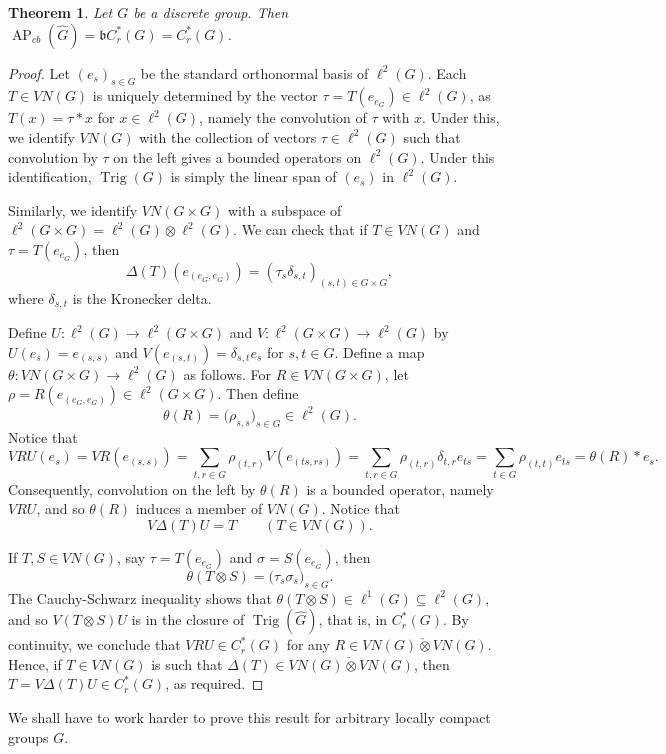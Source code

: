 \documentclass[twoside,a4paper]{article}
\newtheorem{theorem}{Theorem}[section]
\theoremstyle{definition}
\theoremstyle{remark}
\newcommand{\ap}{{\operatorname{AP}}}
\newcommand{\Trig}{{\operatorname{Trig}}}
\newcommand{\inten}{\check\otimes}
\newcommand{\mf}{\mathfrak}
\begin{document}
\begin{theorem}
Let $G$ be a discrete group.  Then $\ap_{cb}(\hat G) = \mf b C^*_r(G) = C^*_r(G)$.
\end{theorem}
\begin{proof}
Let $(e_s)_{s\in G}$ be the standard orthonormal basis of $\ell^2(G)$.  Each $T\in VN(G)$
is uniquely determined by the vector $\tau = T(e_{e_G})\in\ell^2(G)$, as $T(x) = \tau * x$
for $x\in\ell^2(G)$, namely the convolution of $\tau$ with $x$.  Under this, we identify
$VN(G)$ with the collection of vectors $\tau\in\ell^2(G)$ such that convolution by $\tau$ on
the left gives a bounded operators on $\ell^2(G)$.  Under this identification, $\Trig(G)$
is simply the linear span of $(e_s)$ in $\ell^2(G)$.

Similarly, we identify $VN(G\times G)$ with a subspace of $\ell^2(G\times G) = \ell^2(G)
\otimes \ell^2(G)$.  We can check that if $T\in VN(G)$ and $\tau = T(e_{e_G})$, then
\[ \Delta(T)(e_{(e_G,e_G)}) = ( \tau_s \delta_{s,t} )_{(s,t)\in G\times G}, \]
where $\delta_{s,t}$ is the Kronecker delta.

Define $U:\ell^2(G)\rightarrow\ell^2(G\times G)$ and
$V:\ell^2(G\times G)\rightarrow\ell^2(G)$ by $U(e_s) = e_{(s,s)}$ and $V(e_{(s,t)})
= \delta_{s,t} e_s$ for $s,t\in G$.
Define a map $\theta:VN(G\times G) \rightarrow \ell^2(G)$ as follows.  For $R\in VN(G\times G)$,
let $\rho = R(e_{(e_G,e_G)}) \in \ell^2(G\times G)$.  Then define
\[ \theta(R) = \big( \rho_{s,s} \big)_{s\in G} \in \ell^2(G). \]
Notice that
\[ VRU(e_s) = VR(e_{(s,s)}) = \sum_{t,r\in G} \rho_{(t,r)} V(e_{(ts,rs)})
= \sum_{t,r\in G} \rho_{(t,r)} \delta_{t,r} e_{ts}
= \sum_{t\in G} \rho_{(t,t)} e_{ts} = \theta(R) * e_s. \]
Consequently, convolution on the left by $\theta(R)$ is a bounded operator, namely
$VRU$, and so $\theta(R)$ induces a member of $VN(G)$.
Notice that
\[ V\Delta(T)U = T \qquad (T\in VN(G)). \]

If $T,S\in VN(G)$, say $\tau = T(e_{e_G})$ and $\sigma = S(e_{e_G})$, then
\[ \theta(T\otimes S) = \big( \tau_s \sigma_s \big)_{s\in G}. \]
The Cauchy-Schwarz inequality shows that $\theta(T\otimes S)\in\ell^1(G)\subseteq\ell^2(G)$,
and so $V(T\otimes S)U$ is in the closure of $\Trig(\hat G)$, that is, in $C^*_r(G)$.
By continuity, we conclude that $V R U \in C^*_r(G)$ for any $R\in VN(G) \inten VN(G)$.
Hence, if $T\in VN(G)$ is such that $\Delta(T)\in VN(G)\inten VN(G)$, then
$T = V\Delta(T)U \in C^*_r(G)$, as required.
\end{proof}

We shall have to work harder to prove this result for arbitrary locally compact groups $G$.
\end{document}
